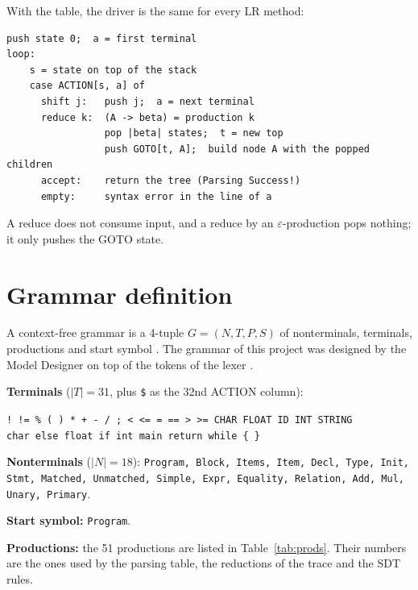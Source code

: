 \documentclass[11pt,letterpaper]{article}
\let\oldsection\section
\renewcommand{\section}{\needspace{8\baselineskip}\oldsection}
\newcommand{\tok}[1]{\texttt{#1}}
\begin{document}
With the table, the driver is the same for every LR method:

\par\noindent\begin{minipage}{\linewidth}
\begin{lstlisting}
push state 0;  a = first terminal
loop:
    s = state on top of the stack
    case ACTION[s, a] of
      shift j:   push j;  a = next terminal
      reduce k:  (A -> beta) = production k
                 pop |beta| states;  t = new top
                 push GOTO[t, A];  build node A with the popped children
      accept:    return the tree (Parsing Success!)
      empty:     syntax error in the line of a
\end{lstlisting}
\end{minipage}\par


A reduce does not consume input, and a reduce by an $\varepsilon$-production
pops nothing; it only pushes the GOTO state.

\FloatBarrier
\section{Grammar definition}

A context-free grammar is a 4-tuple $G=(N,T,P,S)$ of nonterminals,
terminals, productions and start symbol \cite{hopcroft2007}. The grammar of
this project was designed by the Model Designer on top of the
tokens of the lexer \cite{md}.

\textbf{Terminals} ($|T|=31$, plus \tok{\$} as the 32nd ACTION column):
\begin{center}
\texttt{! != \% ( ) * + - / ; < <= = == > >= CHAR FLOAT ID INT STRING}\\
\texttt{char else float if int main return while \{ \}}
\end{center}

\textbf{Nonterminals} ($|N|=18$): \texttt{Program, Block, Items, Item, Decl,
Type, Init, Stmt, Matched, Unmatched, Simple, Expr, Equality, Relation, Add,
Mul, Unary, Primary}.

\textbf{Start symbol:} \texttt{Program}.

\textbf{Productions:} the 51 productions are listed in
Table~\ref{tab:prods}. Their numbers are the ones used by the parsing table,
the reductions of the trace and the SDT rules.
\end{document}
